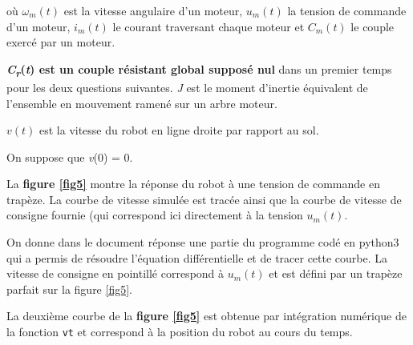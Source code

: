 où \(\omega_{m}\left( t \right)\) est la vitesse angulaire d'un moteur,
\(u_{m}\left( t \right)\) la tension de commande d'un moteur,
\(i_{m}\left( t \right)\) le courant traversant chaque moteur et
\(C_{m}\left( t \right)\) le couple exercé par un moteur.

\textbf{\emph{C\textsubscript{r}}(\emph{t}) est un couple résistant global
supposé nul} dans un premier temps pour les deux questions suivantes.
\emph{J} est le moment d'inertie équivalent de l'ensemble en mouvement
ramené sur un arbre moteur.

 \(v\left( t \right)\) est la vitesse du
robot en ligne droite par rapport au sol.



On suppose que \emph{v}(0) = 0.





La \textbf{figure \ref{fig5}} montre la réponse du robot à une tension de
commande en trapèze. La courbe de vitesse simulée est tracée ainsi que
la courbe de vitesse de consigne fournie (qui correspond ici directement à la tension $u_m(t)$.

On donne dans le document réponse une partie du programme codé en python3 qui a permis de résoudre l'équation différentielle et de tracer cette courbe.
La vitesse de consigne en pointillé correspond à $u_m(t)$ et est défini par un trapèze parfait sur la figure \ref{fig5}.


La deuxième courbe de la \textbf{figure \ref{fig5}} est obtenue par intégration numérique de la fonction \texttt{vt} et correspond à la position du robot au cours du temps. 

